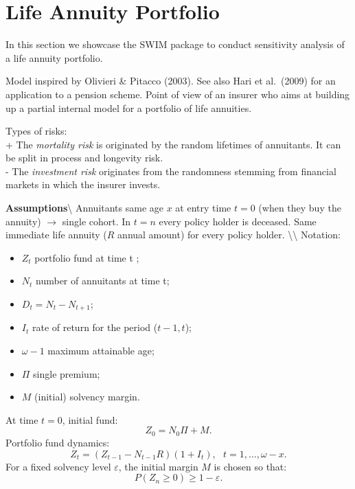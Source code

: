 \documentclass[]{article}
\title{}
\author{}
\date{}
\begin{document}
\hypertarget{life-annuity-portfolio}{%
\section{Life Annuity Portfolio}\label{life-annuity-portfolio}}

In this section we showcase the SWIM package to conduct sensitivity
analysis of a life annuity portfolio.

Model inspired by Olivieri \& Pitacco (2003). See also Hari et
al.~(2009) for an application to a pension scheme. Point of view of an
insurer who aims at building up a partial internal model for a portfolio
of life annuities.

Types of risks:\\
+ The \emph{mortality risk} is originated by the random lifetimes of
annuitants. It can be split in process and longevity risk.\\
- The \emph{investment risk} originates from the randomness stemming
from financial markets in which the insurer invests.

\textbf{Assumptions}\textbackslash{} Annuitants same age \(x\) at entry
time \(t=0\) (when they buy the annuity) \(\rightarrow\) single cohort.
In \(t=n\) every policy holder is deceased. Same immediate life annuity
(\(R\) annual amount) for every policy holder.
\textbackslash{}\textbackslash{} Notation:

\begin{itemize}
    \item $Z_t$ portfolio fund at time t ;
    \item $N_t$  number of annuitants at time t;
    \item $D_t = N_t - N_{t+1}$;
    \item $I_t$ rate of return for the period ($t-1,t$);
    \item $\omega -1 $ maximum attainable age;
    \item $\Pi$ single premium;
    \item $M$ (initial) solvency margin.
\end{itemize}

At time \(t=0\), initial fund: \begin{displaymath}
Z_0 = N_0 \Pi + M.
\end{displaymath} Portfolio fund dynamics: \begin{displaymath}
Z_t = (Z_{t-1} - N_{t-1} R) (1+I_{t}), \ \ \ t=1,\ldots,\omega-x. 
\end{displaymath} For a fixed solvency level \(\varepsilon\), the
initial margin \(M\) is chosen so that: \begin{displaymath}
P(Z_n \ge 0) \ge 1-\varepsilon.
\end{displaymath} \newpage
\end{document}
